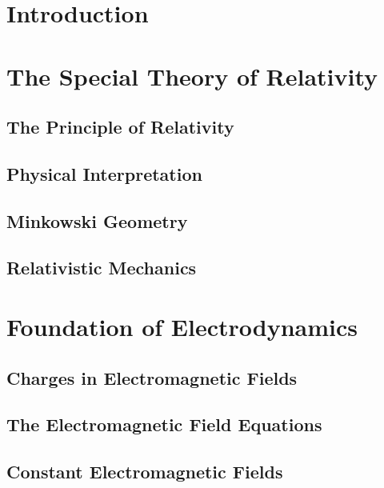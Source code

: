 \documentclass[
    ebook,
    11pt,
    twoside,
    onecolumn,
    openright,
    final
]{memoir}
\begin{document}
\frontmatter

\tableofcontents

\mainmatter

\part{Introduction}


\part{The Special Theory of Relativity}

\chapter{The Principle of Relativity}


\chapter{Physical Interpretation}

\chapter{Minkowski Geometry}

\chapter{Relativistic Mechanics}

\part{Foundation of Electrodynamics}

\chapter{Charges in Electromagnetic Fields}

\chapter{The Electromagnetic Field Equations}

\chapter{Constant Electromagnetic Fields}
\end{document}
